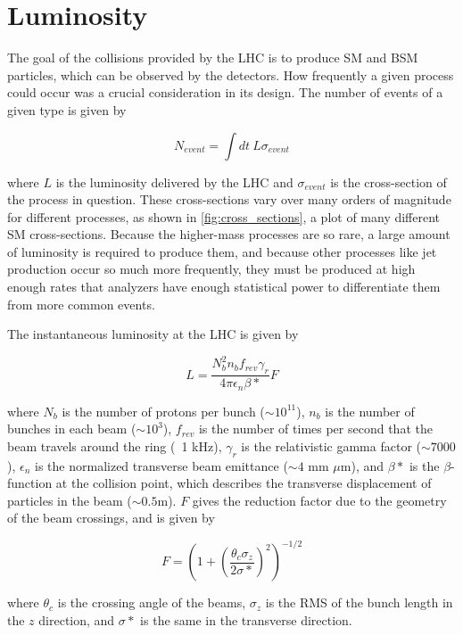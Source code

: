 \section{Luminosity}

The goal of the collisions provided by the \ac{LHC} is to produce \ac{SM} and \ac{BSM} particles, which can be observed by the detectors. How frequently a given process could occur was a crucial consideration in its design. The number of events of a given type is given by

\begin{equation}
N_{event} = \int dt\ L\sigma_{event}
\end{equation}

where $L$ is the luminosity delivered by the \ac{LHC} and $\sigma_{event}$ is the cross-section of the process in question. These cross-sections vary over many orders of magnitude for different processes, as shown in \autoref{fig:cross_sections}, a plot of many different \ac{SM} cross-sections. Because the higher-mass processes are so rare, a large amount of luminosity is required to produce them, and because other processes like jet production occur so much more frequently, they must be produced at high enough rates that analyzers have enough statistical power to differentiate them from more common events.   

The instantaneous luminosity at the \ac{LHC} is given by

\begin{equation}
L = \frac{ N^2_b n_b f_{rev} \gamma_r }{ 4\pi \epsilon_n \beta* } F
\end{equation}

where $N_b$ is the number of protons per bunch ($\sim10^{11}$), $n_b$ is the number of bunches in each beam ($\sim10^3$), $f_{rev}$ is the number of times per second that the beam travels around the ring (~1 kHz), $\gamma_r$ is the relativistic gamma factor ($\sim 7000$), $\epsilon_n$ is the normalized transverse beam emittance ($\sim 4$ mm $\mu$m), and $\beta*$ is the $\beta$-function at the collision point, which describes the transverse displacement of particles in the beam ($\sim 0.5$m). $F$ gives the reduction factor due to the geometry of the beam crossings, and is given by

\begin{equation}
F = (1+ (\frac{\theta_c \sigma_z}{2\sigma*})^2)^{-1/2}
\end{equation}

where $\theta_c$ is the crossing angle of the beams, $\sigma_z$ is the RMS of the bunch length in the $z$ direction, and $\sigma*$ is the same in the transverse direction.

